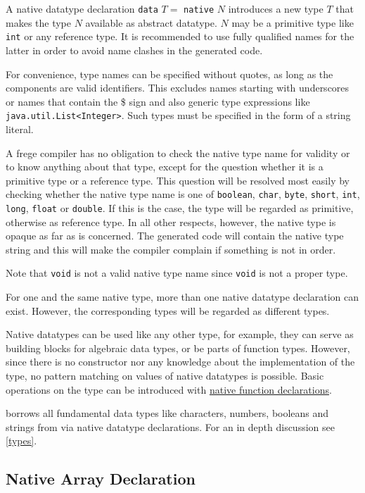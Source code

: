 A native datatype declaration \texttt{data} $T =$ \texttt{native} $N$ introduces a new type $T$ that makes the \java{} type $N$ available as abstract datatype. $N$ may be a primitive type like \texttt{int} or any reference type. It is recommended to use fully qualified \java{} names for the latter in order to avoid name clashes in the generated code.

For convenience, \java{} type names can be specified without quotes, as long as the components are valid \frege{} identifiers. This excludes names starting with underscores or names that contain the \$ sign and also \java{} generic type expressions like \texttt{java.util.List<Integer>}. Such \java{} types must be specified in the form of a string literal.

A frege compiler has no obligation to check the native type name for validity or to know anything about that type, except for the question whether it is a primitive type or a reference type.
This question will be resolved most easily by checking whether the native type name is one of \texttt{boolean}, \texttt{char}, \texttt{byte}, \texttt{short}, \texttt{int}, \texttt{long}, \texttt{float} or \texttt{double}.
If this is the case, the type will be regarded as primitive, otherwise as reference type.
In all other respects, however, the native type is opaque as far as \frege{} is concerned.
The generated code will contain the native type string and this will make the \java{} compiler complain if something is not in order.

Note that \texttt{void} is not a valid native type name since \texttt{void} is not a proper type.

For one and the same native type, more than one native datatype declaration can exist. However, the corresponding \frege{} types will be regarded as different types.

Native datatypes can be used like any other type, for example, they can serve as building blocks for algebraic data types, or be parts of function types. However, since there is no constructor nor any knowledge about the implementation of the type, no pattern matching on values of native datatypes is possible. Basic operations on the type can be introduced with \hyperref[nativefun]{native function declarations}.

\frege{} borrows all fundamental data types like characters, numbers, booleans and strings from \java{} via native datatype declarations. For an in depth discussion see \autoref{types}.

\subsection{Native Array Declaration}   

